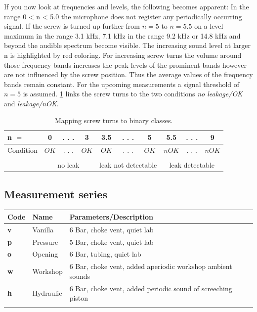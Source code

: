 \documentclass[a4paper,12pt]{article}
\begin{document}
If you now look at frequencies and levels, the following becomes apparent: In the range 0 < n < 5.0 the microphone does not register any periodically occurring signal. If the screw is turned up further from $n = 5$ to $n = 5.5$ on a level maximum in the range 3.1 kHz, 7.1  kHz in the range 9.2 kHz or 14.8 kHz and beyond the audible spectrum become visible. The increasing sound level at larger n is highlighted by red coloring. For increasing screw turns the volume around those frequency bands increases the peak levels of the prominent bands however are not influenced by the screw position. Thus the average values of the frequency bands remain constant. For the upcoming measurements a signal threshold of $n = 5$ is assumed. \ref{tab:mappingclasses} links the screw turns to the two conditions \textit{no leakage/OK} and \textit{leakage/nOK}.

\begin{table}[h]
    \centering
	\begin{tabular}{ | l | c | c | c | c | c | c | c | c | c | }
		\hline
		n $=$  & 0 & . . . & 3 & 3.5 & . . . & 5 & 5.5 & . . . & 9 \\ \hline
		Condition & $OK$ &   . . . & $OK$ & $OK$ & . . . & $OK$ & $nOK$ & . . . & $nOK$ \\ \hline
		\multicolumn{1}{c}{} & \multicolumn{3}{c}{\upbracefill}& \multicolumn{3}{c}{\upbracefill}& \multicolumn{3}{c}{\upbracefill}\\[-1ex]
		\multicolumn{1}{c}{} & \multicolumn{3}{c}{no leak} &\multicolumn{3}{c}{leak not detectable}&\multicolumn{3}{c}{leak detectable}
	\end{tabular}
	\caption{Mapping screw turns to binary classes.}
	\label{tab:mappingclasses}
\end{table}

\subsection{Measurement series}

\begin{table}[h]
    \begin{tabular}{lll}
    \centering
    Code       & Name      & Parameters/Description\\
    \hline
    \textbf{v} & Vanilla   & 6 Bar, choke vent, quiet lab\\ 
    \textbf{p} & Pressure  & 5 Bar, choke vent, quiet lab\\
    \textbf{o} & Opening   & 6 Bar, tubing, quiet lab\\     
    \textbf{w} & Workshop  & 6 Bar, choke vent, added aperiodic workshop ambient sounds\\
    \textbf{h} & Hydraulic & 6 Bar, choke vent, added periodic sound of screeching piston\\
    \label{series}
    \end{tabular}
\end{table}
\end{document}
